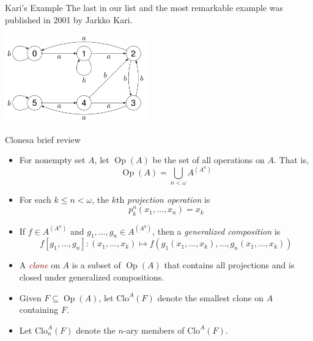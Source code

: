 \documentclass[xcolor=dvipsnames,9pt,hide notes,mathserif]{beamer}
\renewcommand{\alert}[1]{\textcolor{darkred}{\emph{#1}}}
\theoremstyle{definition}
\theoremstyle{remark}
\numberwithin{theorem}{section}
\numberwithin{claim}{section}
\numberwithin{equation}{section}
\numberwithin{conjecture}{section}
\newcommand{\Op}{\ensuremath{\operatorname{Op}}}
\newcommand{\<}{\ensuremath{\langle}}
\renewcommand{\>}{\ensuremath{\rangle}}
\newcommand{\Clo}{\ensuremath{\mathrm{Clo}}}
\begin{document}
\begin{frame}[label=Sporadic]{Kari's Example}
The last in our list and the most remarkable example
was published in 2001 by Jarkko Kari. %
\begin{center}
  \includegraphics[height=1.5in]{Kari6}
\end{center}
\end{frame}

\begin{frame}[shrink=5,label=Clones]{Clones}{a brief review}
  \begin{itemize}
  \item<1->
For nonempty set $A$, let $\Op(A)$ be the set of all operations on $A$.
That is,
\[
\Op(A)  = \bigcup_{n<\omega} A^{(A^n)}
\]

\vskip2mm

  \item<2->
For each $k \leq n < \omega$, the $k$th \emph{projection operation} is
\[
p_k^n(x_1, \dots, x_n) = x_k
\]

\vskip2mm

  \item<2->
If $f\in A^{(A^n)}$ and $g_1, \dots, g_n \in A^{(A^k)}$, then a \emph{generalized
composition} is
\[
f[g_1, \dots, g_n]: (x_1, \dots, x_k) \mapsto f(g_1(x_1,\dots, x_k), \dots,
g_n(x_1,\dots, x_k))
\]

\vskip2mm

  \item<3->
A \alert{clone} on $A$ is a subset of $\Op(A)$ that contains all
projections and is closed under generalized compositions.

\vskip2mm

  \item<4->
Given $F \subseteq \Op(A)$, let $\Clo^A(F)$ denote the smallest clone on $A$
containing $F$.

\vskip2mm

  \item<4->
Let $\Clo_n^A(F)$ denote the $n$-ary members of $\Clo^A(F)$.

  \end{itemize}
\end{frame}
\end{document}
